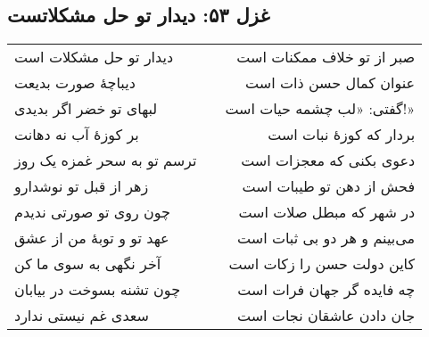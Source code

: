 \begin{center}
\section*{غزل ۵۳: دیدار تو حل مشکلاتست}
\label{sec:053}
\begin{longtable}{l p{0.5cm} r}
دیدار تو حل مشکلات است
&&
صبر از تو خلاف ممکنات است
\\
دیباچهٔ صورت بدیعت
&&
عنوان کمال حسن ذات است
\\
لبهای تو خضر اگر بدیدی
&&
گفتی: «لب چشمه حیات است!»
\\
بر کوزهٔ آب نه دهانت
&&
بردار که کوزهٔ نبات است
\\
ترسم تو به سحر غمزه یک روز
&&
دعوی بکنی که معجزات است
\\
زهر از قبل تو نوشدارو
&&
فحش از دهن تو طیبات است
\\
چون روی تو صورتی ندیدم
&&
در شهر که مبطل صلات است
\\
عهد تو و توبهٔ من از عشق
&&
می‌بینم و هر دو بی ثبات است
\\
آخر نگهی به سوی ما کن
&&
کاین دولت حسن را زکات است
\\
چون تشنه بسوخت در بیابان
&&
چه فایده گر جهان فرات است
\\
سعدی غم نیستی ندارد
&&
جان دادن عاشقان نجات است
\\
\end{longtable}
\end{center}
